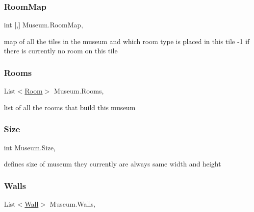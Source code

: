 \mbox{\label{class_museum_add7cf92391f0c501eaf2ebb76ddd54f6}} 
\subsubsection{\texorpdfstring{Room\+Map}{RoomMap}}
{\footnotesize\ttfamily int \mbox{[},\mbox{]} Museum.\+Room\+Map\hspace{0.3cm}{\ttfamily [get]}, {}}



map of all the tiles in the museum and which room type is placed in this tile -\/1 if there is currently no room on this tile 

\mbox{\label{class_museum_afbe49bbdcf1b263d32fd0ae323289e7d}} 
\subsubsection{\texorpdfstring{Rooms}{Rooms}}
{\footnotesize\ttfamily List$<$\mbox{\hyperlink{class_room}{Room}}$>$ Museum.\+Rooms\hspace{0.3cm}{\ttfamily [get]}, {}}



list of all the rooms that build this museum 

\mbox{\label{class_museum_a954b0f1a64a26af54502b46c4058d99d}} 
\subsubsection{\texorpdfstring{Size}{Size}}
{\footnotesize\ttfamily int Museum.\+Size\hspace{0.3cm}{\ttfamily [get]}, {\ttfamily [set]}}



defines size of museum they currently are always same width and height 

\mbox{\label{class_museum_a4851cdf10f162bbf4b26c757874031da}} 
\subsubsection{\texorpdfstring{Walls}{Walls}}
{\footnotesize\ttfamily List$<$\mbox{\hyperlink{class_wall}{Wall}}$>$ Museum.\+Walls\hspace{0.3cm}{\ttfamily [get]}, {}}




